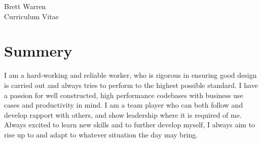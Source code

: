 \documentclass[10pt]{article} %
\begin{document}
\begin{paracol}{2} %


\parbox[top][0.12\textheight][c]{\linewidth}{ %
	\vspace{-0.04\textheight} %
	\centering %
	{\sffamily\Huge Brett Warren}\\\medskip %
	{\Huge\color{headings}\cvtextfont Curriculum Vitae}
}


\section{Summery}


I am a hard-working and reliable worker, who is rigorous in ensuring good design is carried out and always tries to perform to the highest possible standard. I have a passion for well constructed, high performance codebases with business use cases and productivity in mind. I am a team player who can both follow and develop rapport with others, and show leadership where it is required of me. Always excited to learn new skills and to further develop myself, I always aim to rise up to and adapt to whatever situation the day may bring. 

\medskip %



\end{paracol}
\end{document}
